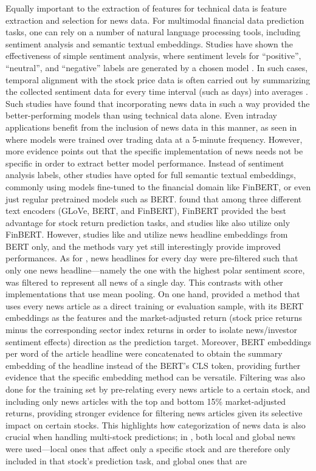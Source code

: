 \documentclass[stu,floatsintext]{apa7}
\begin{document}
Equally important to the extraction of features for technical data is feature extraction and selection for news data. For multimodal financial data prediction tasks, one can rely on a number of natural language processing tools, including sentiment analysis and semantic textual embeddings. Studies have shown the effectiveness of simple sentiment analysis, where sentiment levels for ``positive'', ``neutral'', and ``negative'' labels are generated by a chosen model \parencite{gu2024predicting}. In such cases, temporal alignment with the stock price data is often carried out by summarizing the collected sentiment data for every time interval (such as days) into averages \parencite{halder2022finbertlstm}. Such studies have found that incorporating news data in such a way provided the better-performing models than using technical data alone. Even intraday applications benefit from the inclusion of news data in this manner, as seen in \textcite{ravat2025data} where models were trained over trading data at a 5-minute frequency. However, more evidence points out that the specific implementation of news needs not be specific in order to extract better model performance. Instead of sentiment analysis labels, other studies have opted for full semantic textual embeddings, commonly using models fine-tuned to the financial domain like FinBERT, or even just regular pretrained models such as BERT. \textcite{fataliyev2023mcasp} found that among three different text encoders (GLoVe, BERT, and FinBERT), FinBERT provided the best advantage for stock return prediction tasks, and studies like \textcite{chen2024deep} also utilize only FinBERT. However, studies like \textcite{chen2021stock} and \textcite{yadav2024enhancing} utilize news headline embeddings from BERT only, and the methods vary yet still interestingly provide improved performances. As for \textcite{chen2024deep}, news headlines for every day were pre-filtered such that only one news headline—namely the one with the highest polar sentiment score, was filtered to represent all news of a single day. This contrasts with other implementations that use mean pooling. On one hand, \textcite{chen2021stock} provided a method that uses every news article as a direct training or evaluation sample, with its BERT embeddings as the features and the market-adjusted return (stock price returns minus the corresponding sector index returns in order to isolate news/investor sentiment effects) direction as the prediction target. Moreover, BERT embeddings per word of the article headline were concatenated to obtain the summary embedding of the headline instead of the BERT's CLS token, providing further evidence that the specific embedding method can be versatile. Filtering was also done for the training set by pre-relating every news article to a certain stock, and including only news articles with the top and bottom 15\% market-adjusted returns, providing stronger evidence for filtering news articles given its selective impact on certain stocks. This highlights how categorization of news data is also crucial when handling multi-stock predictions; in \textcite{chen2026newsdriven}, both local and global news were used—local ones that affect only a specific stock and are therefore only included in that stock’s prediction task, and global ones that are 
\end{document}
